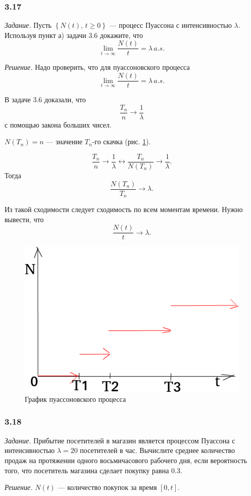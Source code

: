 \subsubsection*{3.17}

\textit{Задание.}
Пусть $ \left\{ N \left( t \right), \, t \geq 0 \right\} $ ---
процесс Пуассона с интенсивностью $ \lambda $.
Используя пункт а) задачи 3.6 докажите, что
$$ \lim \limits_{t \to \infty } \frac{N \left( t \right) }{t} = \lambda \, a.s.$$

\textit{Решение.}
Надо проверить, что для пуассоновского процесса
$$ \lim \limits_{t \to \infty } \frac{N \left( t \right) }{t} = \lambda \, a.s.$$

В задаче 3.6 доказали, что
$$ \frac{T_n}{n} \to
  \frac{1}{ \lambda }$$
с помощью закона больших чисел.

$N \left( T_n \right) = n$ --- значение $T_n$-го скачка (рис. \ref{fig:317}).

$$ \frac{T_n}{n} \to \frac{1}{ \lambda } \leftrightarrow
  \frac{T_n}{N \left( T_n \right) } \to \frac{1}{ \lambda }.$$
Тогда
$$ \frac{N \left( T_n \right) }{T_n} \to \lambda.$$

Из такой сходимости следует сходимость по всем моментам времени.
Нужно вывести, что
$$ \frac{N \left( t \right) }{t} \to \lambda.$$

\begin{figure}[h!]
  \centering
  \includegraphics[width=.4\textwidth]{./pictures/3_17.png}
  \caption{График пуассоновского процесса}
  \label{fig:317}
\end{figure}

\subsubsection*{3.18}

\textit{Задание.}
Прибытие посетителей в магазин является процессом Пуассона с интенсивностью $ \lambda = 20$
посетителей в час.
Вычислите среднее количество продаж на протяжении одного восьмичасового рабочего дня,
если вероятность того, что посетитель магазина сделает покупку равна $0.3$.

\textit{Решение.}
$N \left( t \right) $ --- количество покупок за время $ \left[ 0, t \right] $.

